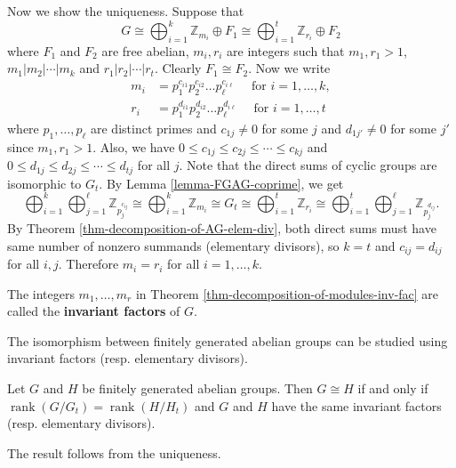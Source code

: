 \begin{sketch}
	Now we show the uniqueness. Suppose that \begin{equation*}
		G \cong \bigoplus_{i=1}^{k} \mathbb{Z}_{m_i} \oplus F_1 \cong \bigoplus_{i=1}^t \mathbb{Z}_{r_i} \oplus F_2
	\end{equation*}
	where $F_1$ and $F_2$ are free abelian, $m_i,r_i$ are integers such that $m_1,r_1>1$, $m_1|m_2|\cdots| m_k$ and $r_1|r_2|\cdots | r_t$. Clearly $F_1 \cong F_2$. Now we write
	\begin{align*}
		m_i &= p_1^{c_{i1}} p_2^{c_{i2}} \dots p_\ell^{c_{i\ell}} \quad \text{ for } i=1,\dots, k,
		\\
		r_i &= p_1^{d_{i1}} p_2^{d_{i2}} \dots p_\ell^{d_{i\ell}} \quad \text{ for } i=1,\dots, t
	\end{align*}
	where $p_1,\dots, p_\ell$ are distinct primes and $c_{1j} \neq 0$ for some $j$ and $d_{1j'}\neq 0$ for some $j'$ since $m_1,r_1>1$. Also, we have $0\leq c_{1j} \leq c_{2j} \leq \cdots \leq c_{kj}$ and $0\leq d_{1j} \leq d_{2j} \leq \cdots \leq d_{tj}$ for all $j$. Note that the direct sums of cyclic groups are isomorphic to $G_t$. By Lemma \ref{lemma-FGAG-coprime}, we get
	\begin{equation*}
		\bigoplus_{i=1}^{k}  \bigoplus_{j=1}^{\ell} \mathbb{Z}_{p_j^{c_{ij}}} \cong \bigoplus_{i=1}^k \mathbb{Z}_{m_i} \cong G_t \cong \bigoplus_{i=1}^t \mathbb{Z}_{r_i} \cong \bigoplus_{i=1}^{t}  \bigoplus_{j=1}^{\ell} \mathbb{Z}_{p_j^{d_{ij}}}.
	\end{equation*}
	By Theorem \ref{thm-decomposition-of-AG-elem-div}, both direct sums must have same number of nonzero summands (elementary divisors), so $k = t$ and $c_{ij} = d_{ij}$ for all $i,j$. Therefore $m_i = r_i$ for all $i = 1,\dots, k$.
\end{sketch}
\begin{definition}
	The integers $m_1,\dots, m_r$ in Theorem \ref{thm-decomposition-of-modules-inv-fac} are called the \textbf{invariant factors} of $G$.
\end{definition}
The isomorphism between finitely generated abelian groups can be studied using invariant factors (resp. elementary divisors).
\begin{corollary}
	Let $G$ and $H$ be finitely generated abelian groups. Then $G\cong H$ if and only if $\operatorname{rank}(G/ G_t)=\operatorname{rank}(H/ H_t)$ and $G$ and $H$ have
	the same invariant factors (resp. elementary divisors). 
\end{corollary}
\begin{sketch}
	The result follows from the uniqueness.
\end{sketch}


